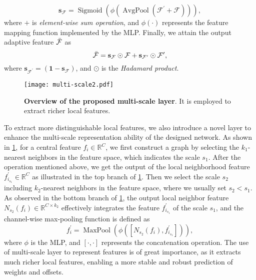 \documentclass[runningheads]{llncs}
\begin{document}
 \begin{equation}
\mathbf{s}_{\mathcal{F}}=\operatorname{Sigmoid}\left(\phi\left(\operatorname{AvgPool} \left(\mathcal{F}^{\prime}+\mathcal{F}\right)\right)\right),
\end{equation}
where $+$ is \emph{element-wise sum operation}, and $\phi \left(\cdot \right)$ represents the feature mapping function implemented by the MLP. Finally, we attain the output adaptive feature $\Bar{\mathcal{F}}$ as
 \begin{equation}
\Bar{\mathcal{F}}=\mathbf{s}_{\mathcal{F}} \odot \mathcal{F} + \mathbf{s}_{\mathcal{F}^{\prime}} \odot \mathcal{F}^{\prime},
\end{equation}
where $\mathbf{s}_{\mathcal{F}^{\prime}}= \left(\mathbf{1}-\mathbf{s}_{\mathcal{F}}\right)$, and $\odot$ is the \emph{Hadamard product}. 

 \begin{figure}[t]
  \centering
   \texttt{[image: multi-scale2.pdf]}
   \caption{\textbf{Overview of the proposed multi-scale layer}. It is employed to extract richer local features.
   }
   \label{fig:multi-scale}
\end{figure}
 To extract more distinguishable local features, we also introduce a novel layer to enhance the multi-scale representation ability of the designed network. As shown in \cref{fig:multi-scale},
for a central feature $f_{i} \in \mathbb{R}^{C}$, we first construct a graph by selecting the $k_{1}$-nearest neighbors in the feature space, which indicates the scale $s_{1}$. After the operation mentioned above, we get the output of the local neighborhood feature $f_{i_{s_{1}}}^{\prime} \in \mathbb{R}^{C}$ as illustrated in the top branch of \cref{fig:multi-scale}. Then we select the scale $s_{2}$ including $k_{2}$-nearest neighbors in the feature space, where we usually set $s_{2} < s_{1}$. As observed in the bottom branch of \cref{fig:multi-scale}, the output local neighbor feature $N_{s_{2}}\left(f_{i}\right) \in \mathbb{R}^{C\times k_{2}}$ effectively integrates the feature $f_{i_{s_{1}}}^{\prime}$ of the scale $s_{1}$, and the channel-wise max-pooling function is defined as \begin{equation}
f_{i}^{\prime}=\operatorname{MaxPool} \left(\phi\left(\left[N_{s_{2}}\left(f_{i}\right), f_{i_{s_{1}}}^{\prime}\right]\right)\right),
\end{equation}
where $\phi$ is the MLP, and $\left[\cdot, \cdot \right]$ represents the concatenation operation. The use of multi-scale layer to represent features is of great importance, as it extracts much richer local features, enabling a more stable and robust prediction of weights and offsets.
\end{document}
